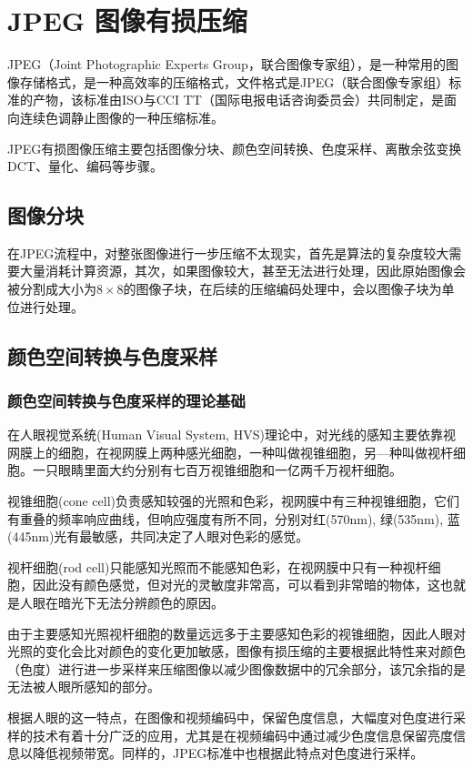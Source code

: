 \chapter{JPEG 图像有损压缩}
JPEG（Joint Photographic Experts Group，联合图像专家组），是一种常用的图像存储格式，是一种高效率的压缩格式，文件格式是JPEG（联合图像专家组）标准的产物，该标准由ISO与CCI TT（国际电报电话咨询委员会）共同制定，是面向连续色调静止图像的一种压缩标准。

JPEG有损图像压缩主要包括图像分块、颜色空间转换、色度采样、离散余弦变换DCT、量化、编码等步骤。

\section{图像分块}
在JPEG流程中，对整张图像进行一步压缩不太现实，首先是算法的复杂度较大需要大量消耗计算资源，其次，如果图像较大，甚至无法进行处理，因此原始图像会被分割成大小为$8\times 8$的图像子块，在后续的压缩编码处理中，会以图像子块为单位进行处理。

\section{颜色空间转换与色度采样}
\subsection{颜色空间转换与色度采样的理论基础}

在人眼视觉系统(Human Visual System, HVS)理论\cite{HVS}中，对光线的感知主要依靠视网膜上的细胞，在视网膜上两种感光细胞，一种叫做视锥细胞，另—种叫做视杆细胞。一只眼睛里面大约分别有七百万视锥细胞和一亿两千万视杆细胞。

视锥细胞(cone cell)负责感知较强的光照和色彩，视网膜中有三种视锥细胞，它们有重叠的频率响应曲线，但响应强度有所不同，分别对红(570nm), 绿(535nm), 蓝(445nm)光有最敏感，共同决定了人眼对色彩的感觉。

视杆细胞(rod cell)只能感知光照而不能感知色彩，在视网膜中只有一种视杆细胞，因此没有颜色感觉，但对光的灵敏度非常高，可以看到非常暗的物体，这也就是人眼在暗光下无法分辨颜色的原因。

由于主要感知光照视杆细胞的数量远远多于主要感知色彩的视锥细胞，因此人眼对光照的变化会比对颜色的变化更加敏感，图像有损压缩的主要根据此特性来对颜色（色度）进行进一步采样来压缩图像以减少图像数据中的冗余部分，该冗余指的是无法被人眼所感知的部分。

根据人眼的这一特点，在图像和视频编码中，保留色度信息，大幅度对色度进行采样的技术有着十分广泛的应用，尤其是在视频编码中通过减少色度信息保留亮度信息以降低视频带宽。同样的，JPEG标准中也根据此特点对色度进行采样。

